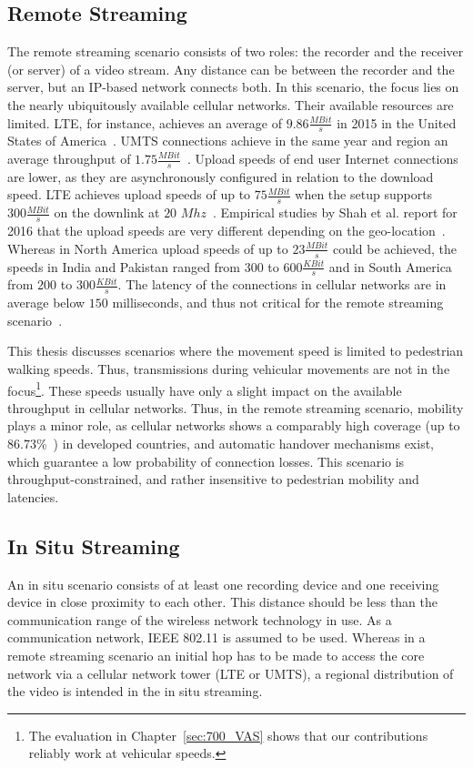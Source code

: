 \subsection{Remote Streaming}
The remote streaming scenario consists of two roles: the recorder and the receiver (or server) of a video stream.
Any distance can be between the recorder and the server, but an \ac{IP}-based network connects both.
In this scenario, the focus lies on the nearly ubiquitously available cellular networks. 
Their available resources are limited.
\ac{LTE}, for instance, achieves an average of $9.86\unit{\frac{MBit}{s}}$ in 2015 in the United States of America~\cite{OpenSignal2016}.
\ac{UMTS} connections achieve in the same year and region an average throughput of $1.75\unit{\frac{MBit}{s}}$~\cite{OpenSignal2016}. 
Upload speeds of end user Internet connections are lower, as they are asynchronously configured in relation to the download speed.
\ac{LTE} achieves upload speeds of up to $75\unit{\frac{MBit}{s}}$ when the setup supports $300\unit{\frac{MBit}{s}}$ on the downlink at $20$ $\unit{Mhz}$~\cite{Ghosh2010}. 
Empirical studies by Shah et al. report for 2016 that the upload speeds are very different depending on the geo-location~\cite{Shah2016}.
Whereas in North America upload speeds of up to $23\unit{\frac{MBit}{s}}$ could be achieved, the speeds in India and Pakistan ranged from $300$ to $600\unit{\frac{KBit}{s}}$ and in South America from $200$ to $300\unit{\frac{KBit}{s}}$.
The latency of the connections in cellular networks are in average below $150$ milliseconds, and thus not critical for the remote streaming scenario~\cite{OpenSignal2016}.

This thesis discusses scenarios where the movement speed is limited to pedestrian walking speeds. Thus, transmissions during vehicular movements are not in the focus\footnote{The evaluation in Chapter~\ref{sec:700_VAS} shows that our contributions reliably work at vehicular speeds.}.
These speeds usually have only a slight impact on the available throughput in cellular networks.
Thus, in the remote streaming scenario, mobility plays a minor role, as cellular networks shows a comparably high coverage (up to 86.73\%~\cite{OpenSignal2016}) in developed countries, and automatic handover mechanisms exist, which guarantee a low probability of connection losses.
This scenario is throughput-constrained, and rather insensitive to pedestrian mobility and latencies.
\subsection{In Situ Streaming}
\label{sec:520_scenario_insitu}
An in situ scenario consists of at least one recording device and one receiving device in close proximity to each other.
This distance should be less than the communication range of the wireless network technology in use.
As a communication network, IEEE 802.11 is assumed to be used.
Whereas in a remote streaming scenario an initial hop has to be made to access the core network via a cellular network tower (\ac{LTE} or \ac{UMTS}), a regional distribution of the video is intended in the in situ streaming.

